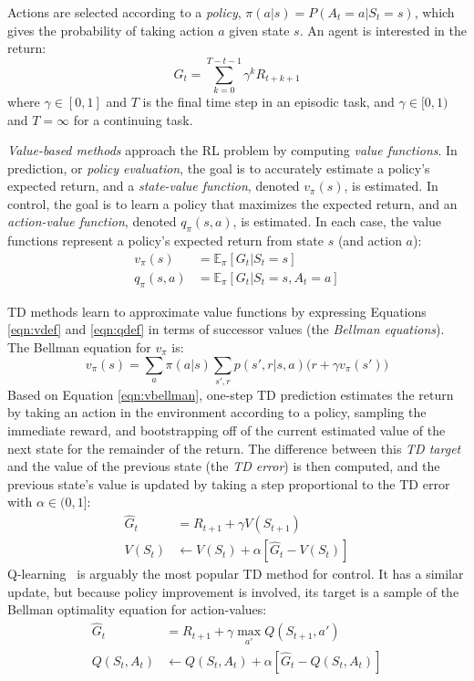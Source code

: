 \documentclass[letterpaper]{article} %
\begin{document}
Actions are selected according to a \textit{policy}, $\pi(a|s) = P(A_t=a|S_t=s)$, which gives the probability of taking action $a$ given state $s$. An agent is interested in the return:
\begin{equation}
G_t = \sum_{k=0}^{T-t - 1} \gamma^{k} R_{t+k+1}
\label{eqn:returndef}
\end{equation}
where $\gamma \in [0,1]$ and $T$ is the final time step in an episodic task, and $\gamma \in [0,1)$ and $T = \infty$ for a continuing task.

\textit{Value-based methods} approach the RL problem by computing \textit{value functions}. In prediction, or \textit{policy evaluation}, the goal is to accurately estimate a policy's expected return, and a \textit{state-value function}, denoted $v_\pi(s)$, is estimated. In control, the goal is to learn a policy that maximizes the expected return, and an \textit{action-value function}, denoted $q_\pi(s, a)$, is estimated. In each case, the value functions represent a policy's expected return from state $s$ (and action $a$):
\begin{align}
v_\pi(s) &= \mathbb{E}_\pi[G_t|S_t=s]
\label{eqn:vdef}\\
q_\pi(s,a) &= \mathbb{E}_\pi[G_t|S_t=s,A_t=a]
\label{eqn:qdef}
\end{align}

TD methods learn to approximate value functions by expressing Equations \ref{eqn:vdef} and \ref{eqn:qdef} in terms of successor values (the \textit{Bellman equations}). The Bellman equation for $v_\pi$ is:
\begin{equation}
v_\pi(s) = \sum_{a}{\pi(a|s)\sum_{s',r}{p(s',r|s,a)\Big(r + \gamma v_\pi(s')\Big)}}
\label{eqn:vbellman}
\end{equation}
Based on Equation \ref{eqn:vbellman}, one-step TD prediction estimates the return by taking an action in the environment according to a policy, sampling the immediate reward, and bootstrapping off of the current estimated value of the next state for the remainder of the return.
The difference between this \textit{TD target} and the value of the previous state (the \textit{TD error}) is then computed, and the previous state's value is updated by taking a step proportional to the TD error with $\alpha \in (0, 1]$:
\begin{align}
\hat{G}_t &= R_{t+1} + \gamma V(S_{t+1})
\label{eqn:tdtarget} \\
V(S_t) &\leftarrow V(S_t) + \alpha [\hat{G}_t - V(S_t)]
\label{eqn:tdupdate}
\end{align}
Q-learning~\cite{watkinsq1989} is arguably the most popular TD method for control. It has a similar update, but because policy improvement is involved, its target is a sample of the Bellman optimality equation for action-values:
\begin{align}
\hat{G}_t &= R_{t+1} + \gamma \max_{a'}{Q(S_{t+1}, a')}
\label{eqn:qltarget} \\
Q(S_t, A_t) &\leftarrow Q(S_t, A_t) + \alpha [\hat{G}_t - Q(S_t, A_t)]
\label{eqn:qlupdate}
\end{align}
\end{document}
